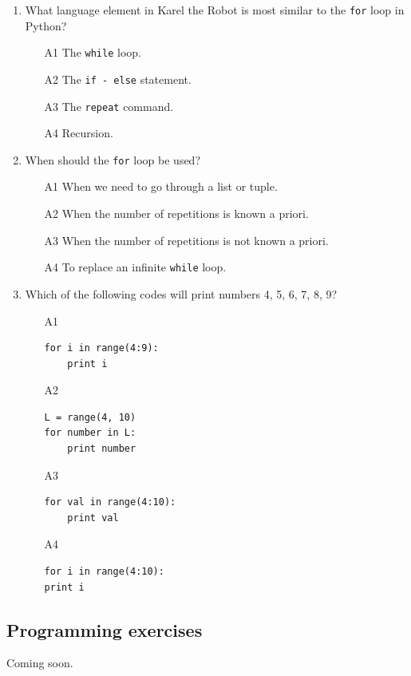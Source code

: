 \begin{enumerate}
\item What language element in Karel the Robot is most similar to the {\tt for} loop in Python?
\begin{enumerate}
\item[A1] The {\tt while} loop.
\item[A2] The {\tt if - else} statement.
\item[A3] The {\tt repeat} command.
\item[A4] Recursion.
\end{enumerate}
\item When should the {\tt for} loop be used?
\begin{enumerate}
\item[A1] When we need to go through a list or tuple.
\item[A2] When the number of repetitions is known a priori. 
\item[A3] When the number of repetitions is not known a priori. 
\item[A4] To replace an infinite {\tt while} loop.
\end{enumerate}
\item Which of the following codes will print numbers 4, 5, 6, 7, 8, 9?
\begin{enumerate}
\item[A1] 
\begin{verbatim}
for i in range(4:9):
    print i
\end{verbatim}
\item[A2] 
\begin{verbatim}
L = range(4, 10)
for number in L:
    print number
\end{verbatim}
\item[A3] 
\begin{verbatim}
for val in range(4:10):
    print val
\end{verbatim}
\item[A4] 
\begin{verbatim}
for i in range(4:10):
print i
\end{verbatim}
\end{enumerate}
\end{enumerate}

\subsection{Programming exercises}

Coming soon.

